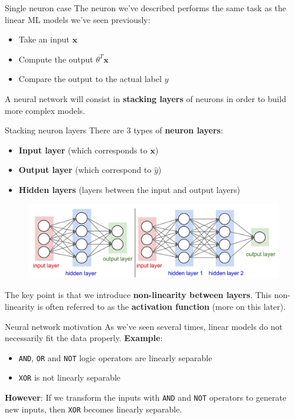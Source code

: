 \documentclass{beamer}
\newcommand{\1}[1]{\mathbbm{1}\left[#1\right]}
\newcommand{\yhat}{\hat{y}}
\newcommand{\bx}{\bm{x}}
\newcommand{\pv}{\pause\vfill}
\begin{document}
\begin{frame}{Single neuron case}
The neuron we've described performs the same task as the linear ML models we've seen previously:
\begin{itemize}
	\item Take an input $\bx$
	\item Compute the output $\theta^T\bx$
	\item Compare the output to the actual label $y$
\end{itemize}
\pv
A neural network will consist in \textbf{stacking layers} of neurons in order to build more complex models.
\end{frame}

\begin{frame}{Stacking neuron layers}
There are 3 types of \textbf{neuron layers}:
\begin{itemize}
	\item \textbf{Input layer} (which corresponds to $\bx$)
	\item \textbf{Output layer} (which correspond to $\yhat$)
	\item \textbf{Hidden layers} (layers between the input and output layers)
\end{itemize}
\pv
\begin{figure}
\centering
\includegraphics[width=\textwidth]{images/neural_net.png}
\end{figure}
\pv
The key point is that we introduce \textbf{non-linearity between layers}. This non-linearity is often referred to as the \textbf{activation function} (more on this later).
\end{frame}

\begin{frame}{Neural network motivation}
As we've seen several times, linear models do not necessarily fit the data properly. 
\textbf{Example}:
\begin{itemize}
	\item \texttt{AND}, \texttt{OR} and \texttt{NOT} logic operators are linearly separable
	\item \texttt{XOR} is not linearly separable
\end{itemize}
\pv
\textbf{However}: If we transform the inputs with \texttt{AND} and \texttt{NOT} operators to generate new inputs, then \texttt{XOR} becomes linearly separable.
\end{frame}
\end{document}
